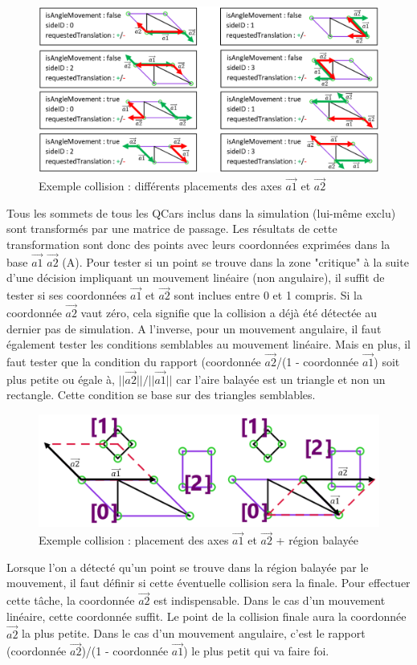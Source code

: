 \documentclass[a4paper, 12pt]{article}
\begin{document}
\begin{figure}[h!]
\centering
\includegraphics[width=\linewidth]{includes/images/collisions/3_axes}
\caption{Exemple collision : différents placements des axes $\vec{a1}$ et $\vec{a2}$}
\label{fig:3axes}
\end{figure}
Tous les sommets de tous les QCars inclus dans la simulation (lui-même exclu) sont transformés par une matrice de passage. Les résultats de cette transformation sont donc des points avec leurs coordonnées exprimées dans la base $\vec{a1}$ $\vec{a2} $ (A). Pour tester si un point se trouve dans la zone "critique" à la suite d'une décision impliquant un mouvement linéaire (non angulaire), il suffit de tester si ses coordonnées $\vec{a1}$ et $\vec{a2}$ sont inclues entre 0 et 1 compris. Si la coordonnée $\vec{a2}$ vaut zéro, cela signifie que la collision a déjà été détectée au dernier pas de simulation. A l'inverse, pour un mouvement angulaire, il faut également tester les conditions semblables au mouvement linéaire. Mais en plus, il faut tester que la condition du rapport (coordonnée $\vec{a2}$/(1 - coordonnée $\vec{a1}$) soit plus petite ou égale à, $||\vec{a2}||/||\vec{a1}||$ car l'aire balayée est un triangle et non un rectangle. Cette condition se base sur des triangles semblables.
\begin{figure}[h!]
\centering
\includegraphics[width=0.7\linewidth]{includes/images/collisions/4_axesPosition}
\caption{Exemple collision : placement des axes $\vec{a1}$ et $\vec{a2}$ + région balayée}
\label{fig:4axesposition}
\end{figure}
Lorsque l'on a détecté qu'un point se trouve dans la région balayée par le mouvement, il faut définir si cette éventuelle collision sera la finale. Pour effectuer cette tâche, la coordonnée  $\vec{a2}$ est indispensable. Dans le cas d'un mouvement linéaire, cette coordonnée suffit. Le point de la collision finale aura la coordonnée $\vec{a2}$ la plus petite. Dans le cas d'un mouvement angulaire, c'est le rapport (coordonnée $\vec{a2}$)/(1 - coordonnée $\vec{a1}$) le plus petit qui va faire foi.
\end{document}
